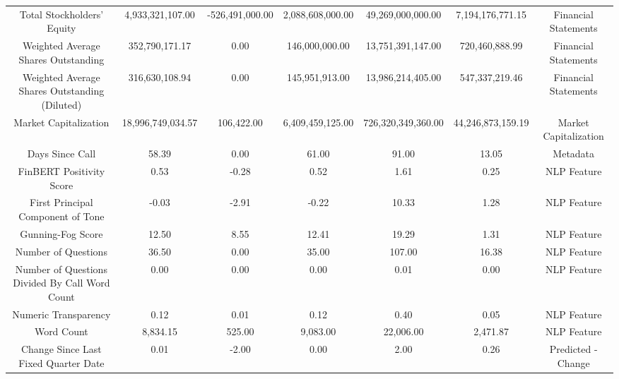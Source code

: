\begin{longtable}{ccccccc}
Total Stockholders' Equity & 4,933,321,107.00 & -526,491,000.00 & 2,088,608,000.00 & 49,269,000,000.00 & 7,194,176,771.15 & Financial Statements \\
Weighted Average Shares Outstanding & 352,790,171.17 & 0.00 & 146,000,000.00 & 13,751,391,147.00 & 720,460,888.99 & Financial Statements \\
Weighted Average Shares Outstanding (Diluted) & 316,630,108.94 & 0.00 & 145,951,913.00 & 13,986,214,405.00 & 547,337,219.46 & Financial Statements \\
Market Capitalization & 18,996,749,034.57 & 106,422.00 & 6,409,459,125.00 & 726,320,349,360.00 & 44,246,873,159.19 & Market Capitalization \\
Days Since Call & 58.39 & 0.00 & 61.00 & 91.00 & 13.05 & Metadata \\
FinBERT Positivity Score & 0.53 & -0.28 & 0.52 & 1.61 & 0.25 & NLP Feature \\
First Principal Component of Tone & -0.03 & -2.91 & -0.22 & 10.33 & 1.28 & NLP Feature \\
Gunning-Fog Score & 12.50 & 8.55 & 12.41 & 19.29 & 1.31 & NLP Feature \\
Number of Questions & 36.50 & 0.00 & 35.00 & 107.00 & 16.38 & NLP Feature \\
Number of Questions Divided By Call Word Count & 0.00 & 0.00 & 0.00 & 0.01 & 0.00 & NLP Feature \\
Numeric Transparency & 0.12 & 0.01 & 0.12 & 0.40 & 0.05 & NLP Feature \\
Word Count & 8,834.15 & 525.00 & 9,083.00 & 22,006.00 & 2,471.87 & NLP Feature \\
Change Since Last Fixed Quarter Date & 0.01 & -2.00 & 0.00 & 2.00 & 0.26 & Predicted - Change \\
\end{longtable}

\normalsize